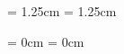 \thispagestyle{plain}


\begin{center}
  \Large

  \textbf{\ifdef{\multilinetitle}{\multilinetitle{}}{\@title}}

  \vspace{0.4cm}
  \large
  \subtitle{}

  \vspace{0.4cm}
  \@author
\end{center}



\vspace{1cm}

\leftskip  = 1.25cm
\rightskip = 1.25cm

\noindent

\leftskip  = 0cm
\rightskip = 0cm

\newpage
